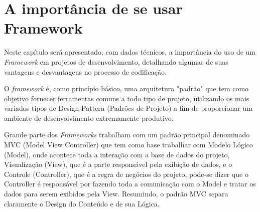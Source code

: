 \chapter{A import\^ancia de se usar Framework\label{cap:importancia}}
    Neste capítulo será apresentado, com dados técnicos, a importância do uso de um \emph{Framework} em projetos de desenvolvimento, detalhando algumas de suas vantagens e desvantagens no processo de codificação.

    O \emph{framework} é, como princ\'ipio b\'asico, uma arquitetura "padrão" que tem como objetivo fornecer ferramentas comuns a todo tipo de projeto, utilizando os mais variados tipos de Design Pattern (Padrões de Projeto) a fim de proporcionar um ambiente de desenvolvimento extremamente produtivo.

    Grande parte dos \emph{Frameworks} trabalham com um padrão principal denominado MVC (Model View Controller) que tem como base trabalhar com Modelo Lógico (Model), onde acontece toda a interação com a base de dados do projeto, Visualização (View), que é a parte responsável pela exibição de dados, e o Controle (Controller), que é a regra de negócios do projeto, pode-se dizer que o Controller é responsável por fazendo toda a comunicação com o Model e tratar os dados para serem exibidos pela View. Resumindo, o padrão MVC separa claramente o Design do Conteúdo e de sua Lógica.

